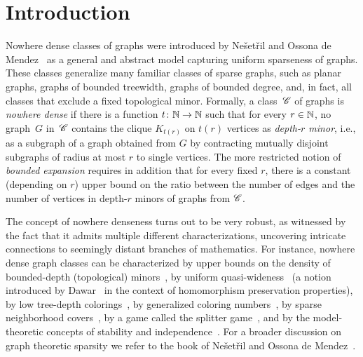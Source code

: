 \section{Introduction}\label{sec:intro}

Nowhere dense classes of graphs were introduced 
by Ne\v set\v ril and Ossona de 
Mendez~\cite{nevsetvril2010first,nevsetvril2011nowhere} as a 
general and abstract model
capturing uniform sparseness of graphs. These classes generalize many 
familiar classes of sparse graphs, such as planar graphs, graphs 
of bounded treewidth,  graphs of bounded degree, and, in fact, 
all classes that exclude a fixed 
topological minor.
Formally, a class~$\mathscr{C}$ of graphs is {\em{nowhere dense}} if there is a function $t\colon \mathbb{N}\to \mathbb{N}$ such that for every $r\in \mathbb{N}$, 
no graph~$G$ in~$\mathscr{C}$ contains the clique $K_{t(r)}$ on $t(r)$ vertices  as  {\em{depth-$r$ minor}},
i.e., as a subgraph of a graph obtained from $G$ by contracting mutually disjoint  subgraphs of radius at most $r$ to single vertices.
The more restricted notion of {\em{bounded expansion}} requires in addition that for every fixed $r$, there is a constant (depending on $r$) upper bound on the ratio 
between the number of edges and the number of vertices in depth-$r$ minors of graphs from $\mathscr{C}$.

The concept of nowhere denseness
turns out to be very robust, as witnessed by the fact that 
it admits multiple different characterizations, uncovering intricate connections to seemingly distant branches of mathematics.
For instance,  nowhere dense graph classes can be characterized 
by upper bounds on the density of bounded-depth (topological) 
minors~\cite{nevsetvril2010first,nevsetvril2011nowhere},
by uniform quasi-wideness~\cite{nevsetvril2011nowhere} (a notion introduced by
Dawar~\cite{dawar2010homomorphism} in the context of homomorphism
preservation properties), by low tree-depth
colorings~\cite{nevsetvril2008grad}, by generalized coloring
numbers~\cite{zhu2009coloring}, by sparse neighborhood
covers~\cite{GroheKRSS15,grohe2014deciding}, by a game called the
splitter game~\cite{grohe2014deciding}, and by the model-theoretic
concepts of stability and independence~\cite{adler2014interpreting}.
For a broader discussion on graph theoretic sparsity we refer to the book
of Ne\v{s}et\v{r}il and Ossona de Mendez~\cite{sparsity}.

